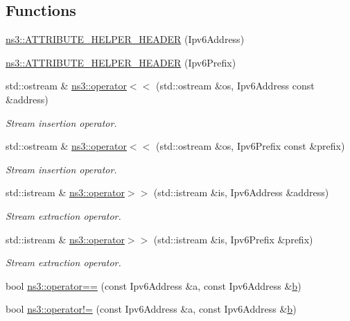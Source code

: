 \subsection*{Functions}
\begin{DoxyCompactItemize}
\item 
\hyperlink{namespacens3_a14e835bffba32925835b633bee0abd8e}{ns3\+::\+A\+T\+T\+R\+I\+B\+U\+T\+E\+\_\+\+H\+E\+L\+P\+E\+R\+\_\+\+H\+E\+A\+D\+ER} (Ipv6\+Address)
\item 
\hyperlink{namespacens3_a64e11513619e02ecaad9278e0c85fe4e}{ns3\+::\+A\+T\+T\+R\+I\+B\+U\+T\+E\+\_\+\+H\+E\+L\+P\+E\+R\+\_\+\+H\+E\+A\+D\+ER} (Ipv6\+Prefix)
\item 
std\+::ostream \& \hyperlink{namespacens3_a9280986a3c66a7fe122a524ee969a8e9}{ns3\+::operator$<$$<$} (std\+::ostream \&os, Ipv6\+Address const \&address)
\begin{DoxyCompactList}\small\item\em Stream insertion operator. \end{DoxyCompactList}\item 
std\+::ostream \& \hyperlink{namespacens3_a00b3b8b7c1aeb9e8872fd8263198d9c7}{ns3\+::operator$<$$<$} (std\+::ostream \&os, Ipv6\+Prefix const \&prefix)
\begin{DoxyCompactList}\small\item\em Stream insertion operator. \end{DoxyCompactList}\item 
std\+::istream \& \hyperlink{namespacens3_a455756db8536b9ad4d841cce1dcc076a}{ns3\+::operator$>$$>$} (std\+::istream \&is, Ipv6\+Address \&address)
\begin{DoxyCompactList}\small\item\em Stream extraction operator. \end{DoxyCompactList}\item 
std\+::istream \& \hyperlink{namespacens3_aa2dd0769f4fe39347bc4ce72c5554b49}{ns3\+::operator$>$$>$} (std\+::istream \&is, Ipv6\+Prefix \&prefix)
\begin{DoxyCompactList}\small\item\em Stream extraction operator. \end{DoxyCompactList}\item 
bool \hyperlink{namespacens3_a7e6eb8616d43e5ee324c2689c7c63fc1}{ns3\+::operator==} (const Ipv6\+Address \&a, const Ipv6\+Address \&\hyperlink{lte__pathloss_8m_a21ad0bd836b90d08f4cf640b4c298e7c}{b})
\item 
bool \hyperlink{namespacens3_aa44e5f76b492fec296b78e589fc948a3}{ns3\+::operator!=} (const Ipv6\+Address \&a, const Ipv6\+Address \&\hyperlink{lte__pathloss_8m_a21ad0bd836b90d08f4cf640b4c298e7c}{b})

\end{DoxyCompactItemize}
